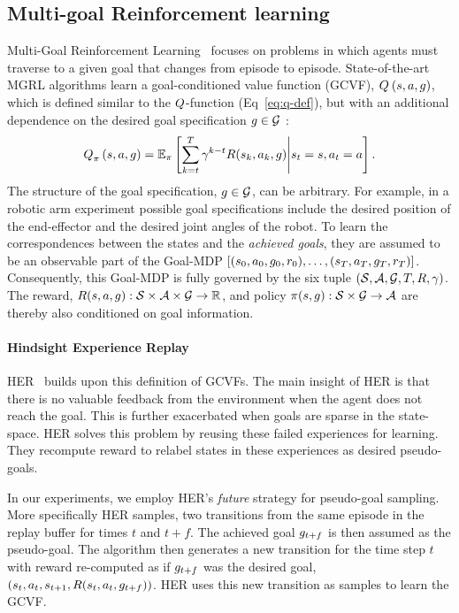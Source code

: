 \subsection{Multi-goal Reinforcement learning}
Multi-Goal Reinforcement Learning~\citep{plappert2018multi} focuses on problems
in which agents must traverse to a given goal that changes from
episode to episode.
State-of-the-art MGRL algorithms learn a goal-conditioned value
function (GCVF), $Q_{}^{}\left({s}, {a}, {g}\right)$, which is defined
similar to the $Q$-function (Eq~\ref{eq:q-def}), but with an additional
dependence on the desired goal specification $g \in \mathcal{G}$ :
%
\begin{align}
Q_{\pi}^{}\left({s}, {a}, {g}\right) = \mathbb{E}_\pi\left[ \sum_{k=t}^T
  \gamma^{k-t} R(s_k, a_k, g)
  \middle| s_t = s, a_t = a \right] .
  \label{eq:q-def}
\end{align}%
%
The structure of the goal specification, $g \in \mathcal{G}$, can be
arbitrary. For example, in a robotic
arm experiment possible goal specifications include the desired position of the
end-effector and the desired joint angles of the robot.
To learn the correspondences between the states and the \emph{achieved goals}, they are
assumed to be an observable part of the Goal-MDP $[(s_0, a_0,
g_0, r_0), \dots, (s_T, a_T, g_T, r_T)]$.
Consequently, this Goal-MDP is fully governed by the six tuple $(\mathcal{S},
\mathcal{A},\mathcal{G}, T, R, \gamma)$. The reward, $R(s,a,
g) : \mathcal{S} \times \mathcal{A}\times \mathcal{G} \rightarrow \mathbb{R} $, and policy
$\pi(s, g): \mathcal{S} \times \mathcal{G} \rightarrow \mathcal{A} $ are
thereby also conditioned on goal information.


\paragraph{Hindsight Experience Replay}
HER~\citep{andrychowicz2017hindsight}
builds upon this definition of GCVFs.  The main insight of HER is that there is
no valuable feedback from the environment when the agent does not reach
the goal. This is further exacerbated when goals are
sparse in the state-space. 
HER solves this problem by reusing these failed experiences for learning.
They recompute reward to relabel states in these experiences as desired pseudo-goals.

In our experiments, we employ HER's \emph{future} strategy for
pseudo-goal sampling. More specifically HER samples, two transitions
from the same episode in the replay buffer for times $t$ and $t+f$.
The achieved goal $g_{t+f}$ is then assumed as the pseudo-goal.
The algorithm then generates a new transition for the time step $t$
with reward re-computed as if $g_{t+f}$ was the desired goal,
$(s_{t}, a_t, s_{t+1}, R(s_t, a_t, g_{t+f}))$.
HER uses this new transition as samples to learn the GCVF.



